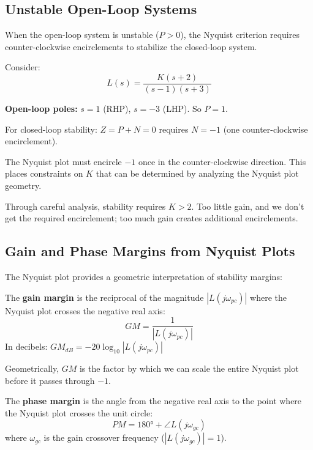 \subsection{Unstable Open-Loop Systems}

When the open-loop system is unstable ($P > 0$), the Nyquist criterion requires counter-clockwise encirclements to stabilize the closed-loop system.

\begin{example}
\label{ex:nyquist_unstable_ol}
Consider:
\begin{equation}
L(s) = \frac{K(s+2)}{(s-1)(s+3)}
\end{equation}

\textbf{Open-loop poles:} $s = 1$ (RHP), $s = -3$ (LHP). So $P = 1$.

For closed-loop stability: $Z = P + N = 0$ requires $N = -1$ (one counter-clockwise encirclement).

The Nyquist plot must encircle $-1$ once in the counter-clockwise direction. This places constraints on $K$ that can be determined by analyzing the Nyquist plot geometry.

Through careful analysis, stability requires $K > 2$. Too little gain, and we don't get the required encirclement; too much gain creates additional encirclements.
\end{example}

\subsection{Gain and Phase Margins from Nyquist Plots}

The Nyquist plot provides a geometric interpretation of stability margins:

\begin{definition}
The \textbf{gain margin} is the reciprocal of the magnitude $|L(j\omega_{pc})|$ where the Nyquist plot crosses the negative real axis:
\begin{equation}
GM = \frac{1}{|L(j\omega_{pc})|}
\end{equation}
In decibels: $GM_{dB} = -20\log_{10}|L(j\omega_{pc})|$
\end{definition}

Geometrically, $GM$ is the factor by which we can scale the entire Nyquist plot before it passes through $-1$.

\begin{definition}
The \textbf{phase margin} is the angle from the negative real axis to the point where the Nyquist plot crosses the unit circle:
\begin{equation}
PM = 180° + \angle L(j\omega_{gc})
\end{equation}
where $\omega_{gc}$ is the gain crossover frequency ($|L(j\omega_{gc})| = 1$).
\end{definition}


